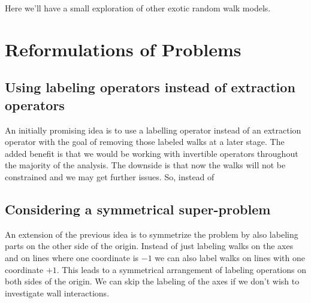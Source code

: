 Here we'll have a small exploration of other exotic random walk models.

\section{Reformulations of Problems}
\label{sec:Reform}

\subsection{Using labeling operators instead of extraction operators}
An initially promising idea is to use a labelling operator instead of an extraction operator with the goal of removing those labeled walks at a later stage. The added benefit is that we would be working with invertible operators throughout the majority of the analysis. The downside is that now the walks will not be constrained and we may get further issues. So, instead of 

\subsection{Considering a symmetrical super-problem}
An extension of the previous idea is to symmetrize the problem by also labeling parts on the other side of the origin. Instead of just labeling walks on the axes and on lines where one coordinate is $-1$ we can also label walks on lines with one coordinate $+1$. This leads to a symmetrical arrangement of labeling operations on both sides of the origin. We can skip the labeling of the axes if we don't wish to investigate wall interactions.

\endinput
